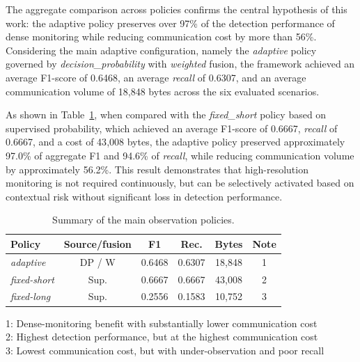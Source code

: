 \documentclass[journal]{IEEEtran}
\begin{document}
The aggregate comparison across policies confirms the central hypothesis of this work: the adaptive policy preserves over 97\% of the detection performance of dense monitoring while reducing communication cost by more than 56\%. Considering the main adaptive configuration, namely the \textit{adaptive} policy governed by \textit{decision\_probability} with \textit{weighted} fusion, the framework achieved an average F1-score of 0.6468, an average \textit{recall} of 0.6307, and an average communication volume of 18{,}848 bytes across the six evaluated scenarios.

As shown in Table~\ref{tab:agg_policy_results}, when compared with the \textit{fixed\_short} policy based on supervised probability, which achieved an average F1-score of 0.6667, \textit{recall} of 0.6667, and a cost of 43{,}008 bytes, the adaptive policy preserved approximately 97.0\% of aggregate F1 and 94.6\% of \textit{recall}, while reducing communication volume by approximately 56.2\%. This result demonstrates that high-resolution monitoring is not required continuously, but can be selectively activated based on contextual risk without significant loss in detection performance.


\begin{table}[ht]
\centering
\caption{Summary of the main observation policies.}
\label{tab:agg_policy_results}
\scriptsize
\begin{tabular}{lcccc c}
\hline
\textbf{Policy} & \textbf{Source/fusion} & \textbf{F1} & \textbf{Rec.} & \textbf{Bytes} & \textbf{Note} \\
\hline
\textit{adaptive} 
& DP / W 
& 0.6468 & 0.6307 & 18,848 & 1 \\

\textit{fixed-short} 
& Sup. 
& 0.6667 & 0.6667 & 43,008 & 2 \\

\textit{fixed-long} 
& Sup. 
& 0.2556 & 0.1583 & 10,752 & 3 \\
\hline
\end{tabular}

\vspace{0.5mm}
\begin{minipage}{\columnwidth}
\footnotesize
1: Dense-monitoring benefit with substantially lower communication cost\\
2: Highest detection performance, but at the highest communication cost\\
3: Lowest communication cost, but with under-observation and poor recall
\end{minipage}
\end{table}
\end{document}
